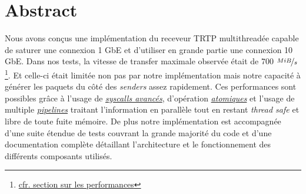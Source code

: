 \documentclass[8pt]{article}
\begin{document}

\newpage

\section{Abstract}

Nous avons conçus une implémentation du receveur TRTP multithreadée capable de saturer une connexion 1 GbE et d'utiliser en grande partie une connexion 10 GbE.
Dans nos tests, la vitesse de transfer maximale observée était de 700 $\nicefrac{MiB}{s}$\footnote{\hyperref[sec:performance]{cfr. section sur les performances}}. Et celle-ci
était limitée non pas par notre implémentation mais notre capacité à générer les paquets du côté des \textit{senders} assez rapidement. Ces performances sont possibles grâce à l'usage de
\textit{\hyperref[sec:syscalls]{syscalls avancés}}, d'opération \textit{\hyperref[sec:atomics]{atomiques}} et l'usage de multiple \textit{\hyperref[sec:pipelines]{pipelines}} traitant
l'information en parallèle tout en restant \textit{thread safe} et libre de toute fuite mémoire. De plus notre implémentation est accompagnée d'une suite
étendue de tests couvrant la grande majorité du code et d'une documentation complète détaillant l'architecture et le fonctionnement des différents composants
utilisés.

\newpage

\tableofcontents
\newpage


\newpage


\newpage


\newpage


\newpage



\end{document}
